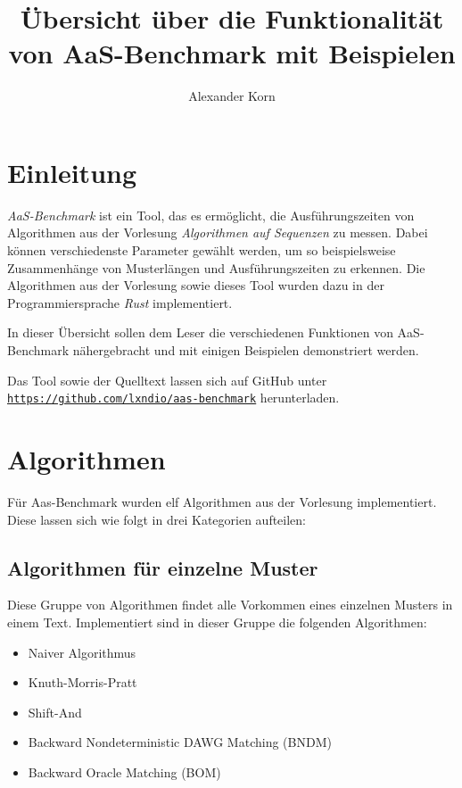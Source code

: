 \documentclass[twocolumn]{article}
\title{\Large \textbf{Übersicht über die Funktionalität von AaS-Benchmark mit Beispielen}}
\author{Alexander Korn}
\date{}
\begin{document}
\maketitle

\tableofcontents

\section{Einleitung}

\textit{AaS-Benchmark} ist ein Tool, das es ermöglicht, die Ausführungszeiten von Algorithmen aus der Vorlesung \textit{Algorithmen auf Sequenzen} zu messen. Dabei können verschiedenste Parameter gewählt werden, um so beispielsweise Zusammenhänge von Musterlängen und Ausführungszeiten zu erkennen. Die Algorithmen aus der Vorlesung sowie dieses Tool wurden dazu in der Programmiersprache \textit{Rust} implementiert.

In dieser Übersicht sollen dem Leser die verschiedenen Funktionen von AaS-Benchmark nähergebracht und mit einigen Beispielen demonstriert werden.

Das Tool sowie der Quelltext lassen sich auf GitHub unter \hyperlink{https://github.com/lxndio/aas-benchmark}{\texttt{https://github.com/lxndio/aas-benchmark}} herunterladen.

\section{Algorithmen}

Für Aas-Benchmark wurden elf Algorithmen aus der Vorlesung implementiert. Diese lassen sich wie folgt in drei Kategorien aufteilen:

\subsection{Algorithmen für einzelne Muster}

Diese Gruppe von Algorithmen findet alle Vorkommen eines einzelnen Musters in einem Text. Implementiert sind in dieser Gruppe die folgenden Algorithmen:

\begin{itemize}
    \item Naiver Algorithmus
    \item Knuth-Morris-Pratt
    \item Shift-And
    \item Backward Nondeterministic DAWG Matching (BNDM)
    \item Backward Oracle Matching (BOM)
\end{itemize}
\end{document}
